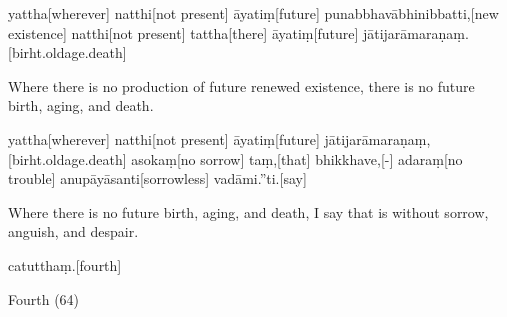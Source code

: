 \begin{samepage}
\begingl[glneveryline={\PaliGlossA,\PaliGlossB}]
yattha[wherever] natthi[not present] āyatiṃ[future] punabbhavābhinibbatti,[new existence] natthi[not present] tattha[there] āyatiṃ[future] jātijarāmaraṇaṃ.[birht.oldage.death]
\endgl
\nopagebreak
\linespread{0.5}
\begin{spacin}{0.2}
{\PaliGlossFT Where there is no production of future renewed existence, there is no future birth, aging, and death.}
\end{spacin}
\vskip 12pt
\end{samepage}
\begin{samepage}
\begingl[glneveryline={\PaliGlossA,\PaliGlossB}]
yattha[wherever] natthi[not present] āyatiṃ[future] jātijarāmaraṇaṃ,[birht.oldage.death] asokaṃ[no sorrow] taṃ,[that] bhikkhave,[-] adaraṃ[no trouble] anupāyāsanti[sorrowless] vadāmi.”ti.[say]
\endgl
\nopagebreak
\linespread{0.5}
\begin{spacin}{0.2}
{\PaliGlossFT Where there is no future birth, aging, and death, I say that is without sorrow, anguish, and despair.}
\end{spacin}
\vskip 12pt
\end{samepage}
\vskip 0.2in
\begin{samepage}
\begingl[glneveryline={\PaliGlossA,\PaliGlossB}]
catutthaṃ.[fourth]
\endgl
\nopagebreak
\linespread{0.5}
\begin{spacin}{0.2}
{\PaliGlossFT Fourth (64)}
\end{spacin}
\vskip 12pt
\end{samepage}